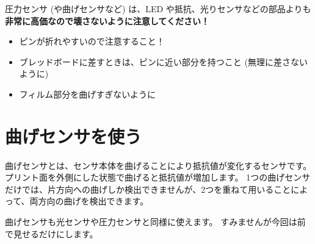 \documentclass[11pt,a4paper]{jarticle}
\begin{document}
圧力センサ (や曲げセンサなど) は、LED や抵抗、光りセンサなどの部品よりも\textbf{非常に高価なので壊さないように注意してください！}
\begin{itemize}
 \item ピンが折れやすいので注意すること！
 \item ブレッドボードに差すときは、ピンに近い部分を持つこと (無理に差さないように)
 \item フィルム部分を曲げすぎないように
\end{itemize}


\section{曲げセンサを使う}
曲げセンサとは、センサ本体を曲げることにより抵抗値が変化するセンサです。
プリント面を外側にした状態で曲げると抵抗値が増加します。
1つの曲げセンサだけでは、片方向への曲げしか検出できませんが、2つを重ねて用いることによって、両方向の曲げを検出できます。

曲げセンサも光センサや圧力センサと同様に使えます。
すみませんが今回は前で見せるだけにします。
\end{document}
